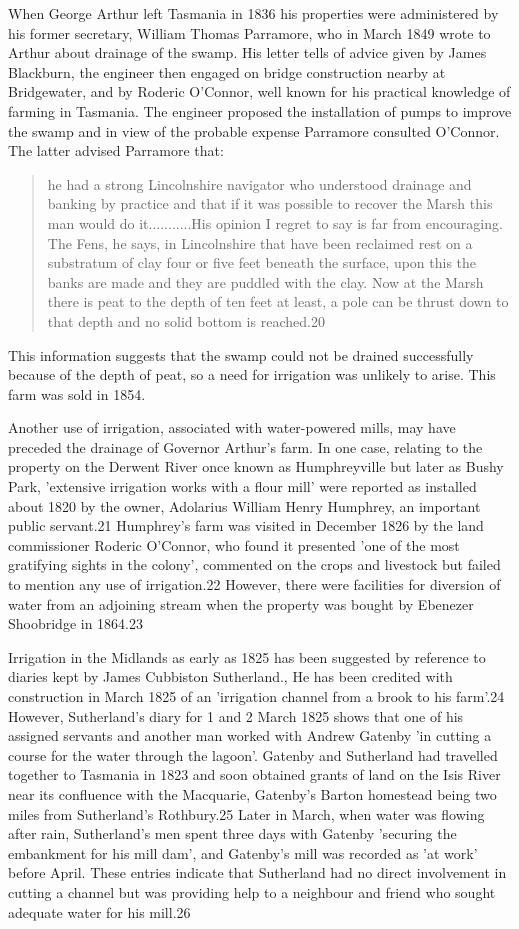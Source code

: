 When George Arthur left Tasmania in 1836 his properties were
administered by his former secretary, William Thomas Parramore, who in
March 1849 wrote to Arthur about drainage of the swamp. His letter
tells of advice given by James Blackburn, the engineer then engaged on
bridge construction nearby at Bridgewater, and by Roderic O'Connor,
well known for his practical knowledge of farming in Tasmania. The
engineer proposed the installation of pumps to improve the swamp and
in view of the probable expense Parramore consulted O'Connor. The
latter advised Parramore that:
\begin{quote}
	he had a strong Lincolnshire navigator who understood drainage
	and banking by practice and that if it was possible to recover
	the Marsh this man would do it...........His opinion I regret
	to say is far from encouraging. The Fens, he says, in
	Lincolnshire that have been reclaimed rest on a substratum of
	clay four or five feet beneath the surface, upon this the
	banks are made and they are puddled with the clay. Now at the
	Marsh there is peat to the depth of ten feet at least, a pole
	can be thrust down to that depth and no solid bottom is
	reached.20
\end{quote}
This information suggests that the swamp could not be drained
successfully because of the depth of peat, so a need for irrigation
was unlikely to arise. This farm was sold in 1854.

Another use of irrigation, associated with water-powered mills, may
have preceded the drainage of Governor Arthur's farm. In one case,
relating to the property on the Derwent River once known as
Humphreyville but later as Bushy Park, 'extensive irrigation works
with a flour mill' were reported as installed about 1820 by the owner,
Adolarius William Henry Humphrey, an important public servant.21
Humphrey's farm was visited in December 1826 by the land commissioner
Roderic O'Connor, who found it presented 'one of the most gratifying
sights in the colony', commented on the crops and livestock but failed
to mention any use of irrigation.22 However, there were facilities for
diversion of water from an adjoining stream when the property was
bought by Ebenezer Shoobridge in 1864.23

Irrigation in the Midlands as early as 1825 has been suggested by
reference to diaries kept by James Cubbiston Sutherland., He has been
credited with construction in March 1825 of an 'irrigation channel
from a brook to his farm'.24 However, Sutherland's diary for 1 and 2
March 1825 shows that one of his assigned servants and another man
worked with Andrew Gatenby 'in cutting a course for the water through
the lagoon'. Gatenby and Sutherland had travelled together to Tasmania
in 1823 and soon obtained grants of land on the Isis River near its
confluence with the Macquarie, Gatenby's Barton homestead being two
miles from Sutherland's Rothbury.25 Later in March, when water was
flowing after rain, Sutherland's men spent three days with Gatenby
'securing the embankment for his mill dam', and Gatenby's mill was
recorded as 'at work' before April. These entries indicate that
Sutherland had no direct involvement in cutting a channel but was
providing help to a neighbour and friend who sought adequate water for
his mill.26

